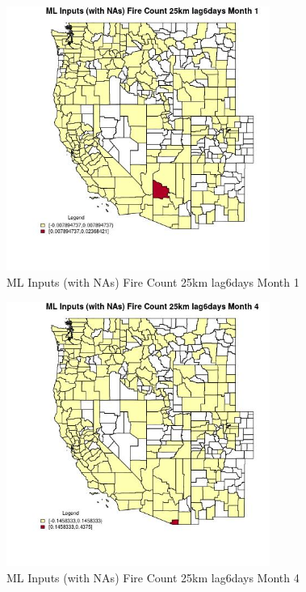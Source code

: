 \begin{figure} 
\centering  
\includegraphics[width=0.77\textwidth]{Code_Outputs/Report_ML_input_PM25_Step4_part_e_de_duplicated_aves_compiled_2019-05-20wNAs_CountyFire_Count_25km_lag6daysmedianMonth1.jpg} 
\caption{\label{fig:Report_ML_input_PM25_Step4_part_e_de_duplicated_aves_compiled_2019-05-20wNAsCountyFire_Count_25km_lag6daysmedianMonth1}ML Inputs (with NAs) Fire Count 25km lag6days Month 1} 
\end{figure} 
 

\begin{figure} 
\centering  
\includegraphics[width=0.77\textwidth]{Code_Outputs/Report_ML_input_PM25_Step4_part_e_de_duplicated_aves_compiled_2019-05-20wNAs_CountyFire_Count_25km_lag6daysmedianMonth4.jpg} 
\caption{\label{fig:Report_ML_input_PM25_Step4_part_e_de_duplicated_aves_compiled_2019-05-20wNAsCountyFire_Count_25km_lag6daysmedianMonth4}ML Inputs (with NAs) Fire Count 25km lag6days Month 4} 
\end{figure} 
 

